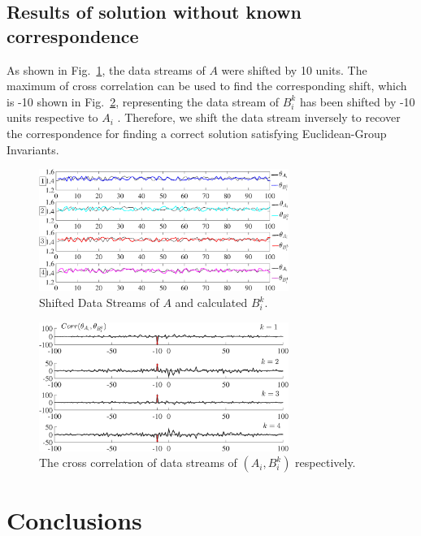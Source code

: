 \documentclass[conference,letterpaper]{IEEEtran}
\begin{document}
\subsection{Results of solution without known correspondence}
As shown in Fig.~\ref{fig7}, the data streams of $A$ were shifted by 10 units. The maximum of cross correlation can be used to find the corresponding shift, which is -10 shown in Fig.~\ref{fig8}, representing the data stream of $B_{i}^{k}$ has been shifted by -10 units respective to ${A_{i}}$ . Therefore, we shift the data stream inversely to recover the correspondence for finding a correct solution satisfying Euclidean-Group Invariants.

\begin{center}
\begin{figure}[htbp]
\centering
\includegraphics[width=3.2in]{fig7.eps}
\caption{
Shifted Data Streams of $A$ and calculated $B_{i}^{k}$.
}
\label{fig7}
\end{figure}
\end{center}
\begin{center}

\begin{figure}[htbp]
\centering
\includegraphics[width=3.2in]{fig8.eps}
\caption{
The cross correlation of data streams of $(A_{i},B_{i}^{k})$ respectively.
}
\label{fig8}
\end{figure}
\end{center}

\section{Conclusions}
\label{sect5}
\end{document}
